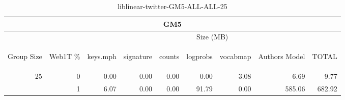 \begin{center}
\begin{table}[htbp] 
 \begin{center}
\begin{tabular}{ | r | r | r | r | r | r | r | r | r |}
\hline
\multicolumn{9}{|c|}{GM5}\\
\hline
 & & \multicolumn{7}{|c|}{Size (MB)}\\ \cline{3-9}
\begin{sideways}Group Size\end{sideways} & \begin{sideways}Web1T \% \end{sideways} & \begin{sideways}keys.mph\end{sideways} & \begin{sideways}signature\end{sideways} & \begin{sideways}counts\end{sideways} & \begin{sideways}logprobs\end{sideways} & \begin{sideways}vocabmap\end{sideways} & \begin{sideways}Authors Model \end{sideways} & \begin{sideways}TOTAL\end{sideways}\\
\hline
\multirow{1}{*}{25}
 & 0 & 0.00 & 0.00 & 0.00 & 0.00 & 3.08 & 6.69 & 9.77\\ \cline{2-9}
 & 1 & 6.07 & 0.00 & 0.00 & 91.79 & 0.00 & 585.06 & 682.92\\ \cline{2-9}
\hline
\end{tabular}
\caption{liblinear-twitter-GM5-ALL-ALL-25}
\label{table:liblinear-twitter-GM5-ALL-ALL-25}
\end{center}
 \end{table}
\end{center}

